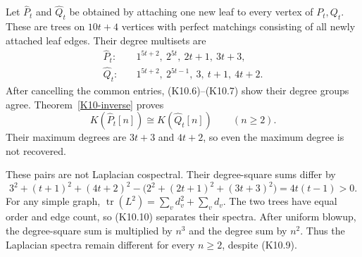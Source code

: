 \documentclass[11pt,a4paper]{article}
\theoremstyle{definition}\newtheorem{definition}[theorem]{Definition}
\theoremstyle{remark}\newtheorem{remark}[theorem]{Remark}
\numberwithin{equation}{section}
\begin{document}
Let $\widehat P_t$ and $\widehat Q_t$ be obtained by attaching one new leaf to every vertex of $P_t,Q_t$. These are trees on $10t+4$ vertices with perfect matchings consisting of all newly attached leaf edges. Their degree multisets are
\begin{align*}
 \widehat P_t:&\quad 1^{5t+2},\ 2^{5t},\ 2t+1,\ 3t+3,\\
 \widehat Q_t:&\quad 1^{5t+2},\ 2^{5t-1},\ 3,\ t+1,\ 4t+2.
                                                                    \tag{K10.8}
\end{align*}
After cancelling the common entries, (K10.6)--(K10.7) show their degree groups agree. Theorem~\ref{K10-inverse} proves
\[
 K(\widehat P_t[n])\cong K(\widehat Q_t[n])\qquad(n\geq2).   \tag{K10.9}
\]
Their maximum degrees are $3t+3$ and $4t+2$, so even the maximum degree is not recovered.

These pairs are not Laplacian cospectral. Their degree-square sums differ by
\[
 3^2+(t+1)^2+(4t+2)^2-
       \bigl(2^2+(2t+1)^2+(3t+3)^2\bigr)=4t(t-1)>0.          \tag{K10.10}
\]
For any simple graph, $\operatorname{tr}(L^2)=\sum_vd_v^2+\sum_vd_v$. The two trees have equal order and edge count, so (K10.10) separates their spectra. After uniform blowup, the degree-square sum is multiplied by $n^3$ and the degree sum by $n^2$. Thus the Laplacian spectra remain different for every $n\geq2$, despite (K10.9).
\end{document}
